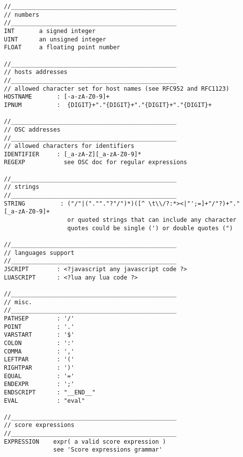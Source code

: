 \begin{verbatim}
//_______________________________________________
// numbers
//_______________________________________________
INT       a signed integer
UINT      an unsigned integer
FLOAT     a floating point number

//_______________________________________________
// hosts addresses
//_______________________________________________
// allowed character set for host names (see RFC952 and RFC1123)
HOSTNAME       : [-a-zA-Z0-9]+ 
IPNUM          :  {DIGIT}+"."{DIGIT}+"."{DIGIT}+"."{DIGIT}+

//_______________________________________________
// OSC addresses
//_______________________________________________
// allowed characters for identifiers
IDENTIFIER     : [_a-zA-Z][_a-zA-Z0-9]*
REGEXP           see OSC doc for regular expressions

//_______________________________________________
// strings
//_______________________________________________
STRING          : ("/"|(".""."?"/")*)([^ \t\\/?:*><|"';=]+"/"?)+"."[_a-zA-Z0-9]+
                  or quoted strings that can include any character
                  quotes could be single (') or double quotes (")

//_______________________________________________
// languages support
//_______________________________________________
JSCRIPT        : <?javascript any javascript code ?>
LUASCRIPT      : <?lua any lua code ?>

//_______________________________________________
// misc.
//_______________________________________________
PATHSEP        : '/'
POINT          : '.'
VARSTART       : '$'
COLON          : ':'
COMMA          : ','
LEFTPAR        : '('
RIGHTPAR       : ')'
EQUAL          : '='
ENDEXPR        : ';'
ENDSCRIPT      : "__END__"
EVAL           : "eval"

//_______________________________________________
// score expressions
//_______________________________________________
EXPRESSION    expr( a valid score expression )
              see 'Score expressions grammar'
\end{verbatim}

